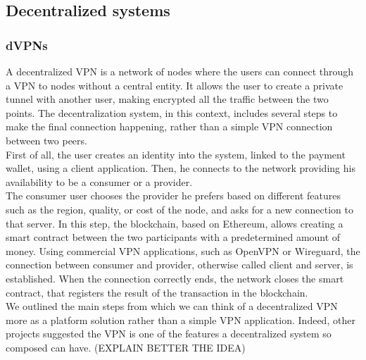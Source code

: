 \documentclass[12pt]{article}
\begin{document}
	\subsection{Decentralized systems}

	\subsubsection{dVPNs}

	A decentralized VPN is a network of nodes where the users can connect through a VPN to nodes without a central entity. It allows the user to create a private tunnel with another user, making encrypted all the traffic between the two points. 
	The decentralization system, in this context, includes several steps to make the final connection happening, rather than a simple VPN connection between two peers.\\
	First of all, the user creates an identity into the system, linked to the payment wallet, using a client application. Then, he connects to the network providing his availability to be a consumer or a provider.\\
	The consumer user chooses the provider he prefers based on different features such as the region, quality, or cost of the node, and asks for a new connection to that server. In this step, the blockchain, based on Ethereum, allows creating a smart contract between the two participants with a predetermined amount of money. Using commercial VPN applications, such as OpenVPN or Wireguard, the connection between consumer and provider, otherwise called client and server, is established. When the connection correctly ends, the network closes the smart contract, that registers the result of the transaction in the blockchain.\\
	We outlined the main steps from which we can think of a decentralized VPN more as a platform solution rather than a simple VPN application. Indeed, other projects suggested the VPN is one of the features a decentralized system so composed can have. (EXPLAIN BETTER THE IDEA)  
		          
\end{document}
